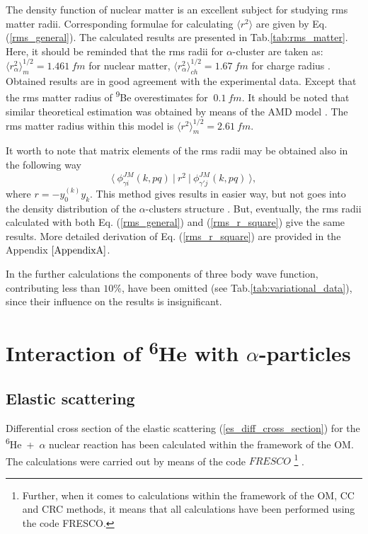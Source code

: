 \documentclass[
12pt, %
oneside, %
english, %
onehalfspacing, %
onehalfspacing, %
headsepline, %
]{MastersDoctoralThesis} %
\newcommand{\he}{\textsuperscript{6}He\xspace}
\newcommand{\be}{\textsuperscript{9}Be\xspace}
\begin{document}
The density function of nuclear matter is an excellent subject for studying rms matter radii. Corresponding formulae for calculating $\langle r^2 \rangle$ are given by Eq.(\ref{rms_general}).
The calculated results are presented in Tab.\ref{tab:rms_matter}. 
Here, it should be reminded that the rms radii for $\alpha$-cluster are taken as: $\langle r^2_\alpha \rangle^{1/2}_m=1.461~fm$ for nuclear matter, $\langle r^2_\alpha \rangle^{1/2}_{ch}=1.67~fm$ for charge radius \cite{satchler1979folding}.
Obtained results are in good agreement with the experimental data.
Except that the rms matter radius of \be overestimates for $~0.1~fm$. 
It should be noted that similar theoretical estimation was obtained 
by means of the AMD model \cite{hirai2011clustering}. The rms matter radius within this model is $\langle r^2 \rangle^{1/2}_m=2.61~fm$. 

It worth to note that matrix elements of the rms radii may be obtained also in the following way
\begin{equation}
\langle~ \phi_{\gamma i}^{JM}(k,pq) ~\vert~ r^2   ~\vert~ \phi_{\gamma' j}^{JM}(k,pq) ~ \rangle, 
\label{rms_r_square}
\end{equation}
where $r=-y_0^{(k)} { y}_k$. This method gives results in easier way, but not goes into the density distribution of the $\alpha$-clusters structure .
But, eventually, the rms radii calculated with both Eq. (\ref{rms_general}) and 
(\ref{rms_r_square}) give the same results. More detailed derivation of Eq. (\ref{rms_r_square}) are provided in the Appendix $\ref{AppendixA}$.   

In the further calculations the components of three body wave function, contributing less than $10\%$, have been omitted (see Tab.\ref{tab:variational_data}), since their  influence on the results is insignificant.

\chapter{Interaction of \he with $\alpha$-particles  }
\section{Elastic scattering}

Differential cross section of the elastic scattering (\ref{es_diff_cross_section}) for the \he~+~$\alpha$ nuclear reaction has been calculated within the framework of the OM. The calculations were carried out by means of the code $FRESCO$
\footnote{Further, when it comes to calculations within the framework of the OM, CC and CRC methods, it means that all calculations have been performed using the  code FRESCO.} 
 \cite{fresco}.
\end{document}
